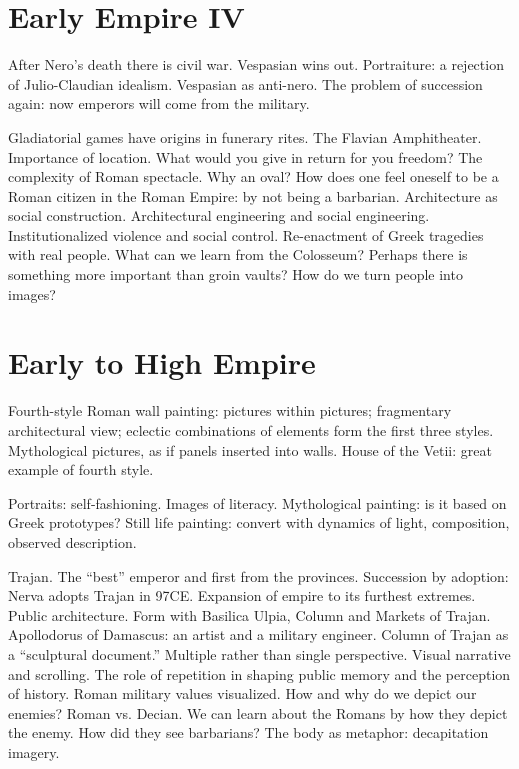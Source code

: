 \documentclass[10pt]{armath}
\begin{document}
\begin{multicols}{2}
\section{Early Empire IV}%
\label{sec:early_empire_iv}

After Nero's death there is civil war. Vespasian wins out. Portraiture: a
rejection of Julio-Claudian idealism. Vespasian as anti-nero. The problem of
succession again: now emperors will come from the military.

Gladiatorial games have origins in funerary rites. The Flavian Amphitheater.
Importance of location. What would you give in return for you freedom? The
complexity of Roman spectacle. Why an oval? How does one feel oneself to be a
Roman citizen in the Roman Empire: by not being a barbarian. Architecture as
social construction. Architectural engineering and social engineering.
Institutionalized violence and social control. Re-enactment of Greek tragedies
with real people. What can we learn from the Colosseum? Perhaps there is
something more important than groin vaults? How do we turn people into images?

\section{Early to High Empire}%
\label{sec:early_to_high_empire}

Fourth-style Roman wall painting: pictures within pictures; fragmentary
architectural view; eclectic combinations of elements form the first three
styles. Mythological pictures, as if panels inserted into walls. House of the
Vetii: great example of fourth style.

Portraits: self-fashioning. Images of literacy. Mythological painting: is it
based on Greek prototypes? Still life painting: convert with dynamics of light,
composition, observed description.

Trajan. The ``best'' emperor and first from the provinces. Succession by
adoption: Nerva adopts Trajan in 97CE. Expansion of empire to its furthest
extremes. Public architecture. Form with Basilica Ulpia, Column and Markets of
Trajan. Apollodorus of Damascus: an artist and a military engineer. Column of
Trajan as a ``sculptural document.'' Multiple rather than single perspective.
Visual narrative and scrolling. The role of repetition in shaping public memory
and the perception of history. Roman military values visualized. How and why do
we depict our enemies? Roman vs. Decian. We can learn about the Romans by how
they depict the enemy. How did they see barbarians? The body as metaphor:
decapitation imagery.


\end{multicols}
\end{document}
